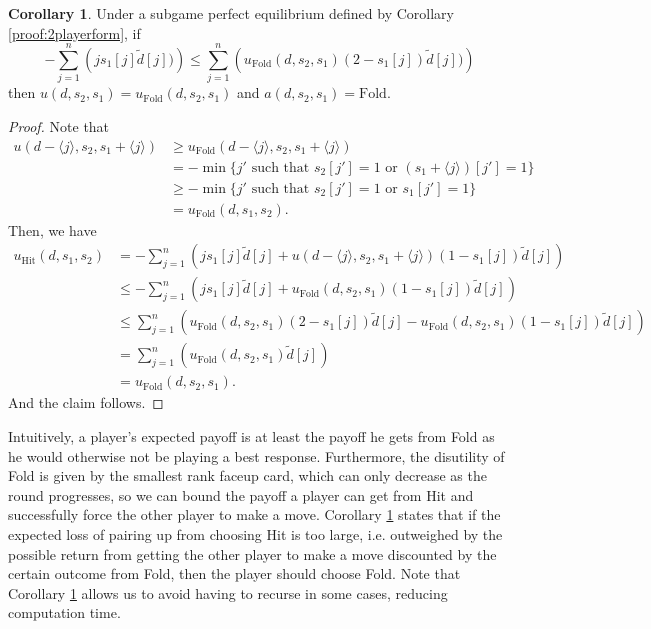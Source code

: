 \documentclass{article}
\theoremstyle{definition}
\newcounter{a}
\newtheorem{corollary}[a]{Corollary}
\begin{document}
\begin{corollary}
Under a subgame perfect equilibrium defined by Corollary \ref{proof:2playerform}, if 
$$ -\sum_{j=1}^n \left( j s_1 [j] \tilde{d}[j]) \right) \le \sum_{j=1}^n \left( u_{\text{Fold}} (d, s_2, s_1) (2 - s_1 [j]) \tilde{d}[j]) \right)$$
then $u(d, s_2, s_1) = u_{\text{Fold}} (d, s_2, s_1)$ and $a(d, s_2, s_1) =\text{Fold}$.
\begin{proof}
Note that
\begin{align*}
u(d - \langle j \rangle, s_2, s_1 + \langle j \rangle) & \ge u_{\text{Fold}} (d - \langle j \rangle, s_2, s_1 + \langle j \rangle) \\
& = -\min\{j' \text{ such that } s_2 [j'] = 1 \text{ or } (s_1 + \langle j \rangle)[j'] = 1\} \\
& \ge -\min\{j' \text{ such that } s_2 [j'] = 1 \text{ or } s_1 [j'] = 1\} \\
& = u_{\text{Fold}} (d, s_1, s_2).
\end{align*}
Then, we have
\begin{align*}
u_{\text{Hit}} (d, s_1, s_2) & = - \sum_{j=1}^n \left( j s_1 [j] \tilde{d}[j] + u(d - \langle j \rangle, s_2, s_1 + \langle j \rangle) (1 - s_1 [j]) \tilde{d} [j] \right) \\
& \le - \sum_{j=1}^n \left( j s_1 [j] \tilde{d}[j] + u_{\text{Fold}} (d, s_2, s_1)(1 - s_1 [j]) \tilde{d} [j] \right) \\
& \le \sum_{j=1}^n \left( u_{\text{Fold}} (d, s_2, s_1) (2 - s_1 [j]) \tilde{d}[j] - u_{\text{Fold}} (d, s_2, s_1)(1 - s_1 [j]) \tilde{d} [j] \right) \\
& = \sum_{j=1}^n \left( u_{\text{Fold}} (d, s_2, s_1) \tilde{d}[j] \right) \\
& = u_{\text{Fold}} (d, s_2, s_1) .
\end{align*}
And the claim follows.
\end{proof}
\label{proof:2playerfoldcondition}
\end{corollary}

Intuitively, a player's expected payoff is at least the payoff he gets from Fold as he would otherwise not be playing a best response. Furthermore, the disutility of Fold is given by the smallest rank faceup card, which can only decrease as the round progresses, so we can bound the payoff a player can get from Hit and successfully force the other player to make a move. Corollary \ref{proof:2playerfoldcondition} states that if the expected loss of pairing up from choosing Hit is too large, i.e. outweighed by the possible return from getting the other player to make a move discounted by the certain outcome from Fold, then the player should choose Fold. Note that Corollary \ref{proof:2playerfoldcondition} allows us to avoid having to recurse in some cases, reducing computation time.
\end{document}
